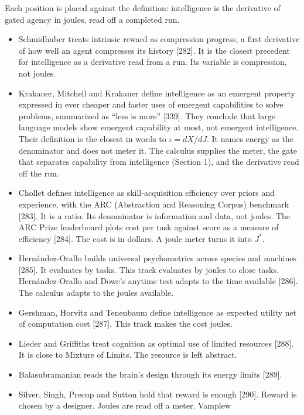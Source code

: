 \documentclass[
  10pt,
]{article}
\providecommand{\tightlist}{%
  \setlength{\itemsep}{0pt}\setlength{\parskip}{0pt}}
\begin{document}
Each position is placed against the definition: intelligence is the
derivative of gated agency in joules, read off a completed run.

\begin{itemize}
\tightlist
\item
  Schmidhuber treats intrinsic reward as compression progress, a first
  derivative of how well an agent compresses its history {[}282{]}. It
  is the closest precedent for intelligence as a derivative read from a
  run. Its variable is compression, not joules.
\item
  Krakauer, Mitchell and Krakauer define intelligence as an emergent
  property expressed in ever cheaper and faster uses of emergent
  capabilities to solve problems, summarized as ``less is more''
  {[}339{]}. They conclude that large language models show emergent
  capability at most, not emergent intelligence. Their definition is the
  closest in words to \(\iota = dX/dJ\). It names energy as the
  denominator and does not meter it. The calculus supplies the meter,
  the gate that separates capability from intelligence (Section 1), and
  the derivative read off the run.
\item
  Chollet defines intelligence as skill-acquisition efficiency over
  priors and experience, with the ARC (Abstraction and Reasoning Corpus)
  benchmark {[}283{]}. It is a ratio. Its denominator is information and
  data, not joules. The ARC Prize leaderboard plots cost per task
  against score as a measure of efficiency {[}284{]}. The cost is in
  dollars. A joule meter turns it into \(J^*\).
\item
  Hernández-Orallo builds universal psychometrics across species and
  machines {[}285{]}. It evaluates by tasks. This track evaluates by
  joules to close tasks. Hernández-Orallo and Dowe's anytime test adapts
  to the time available {[}286{]}. The calculus adapts to the joules
  available.
\item
  Gershman, Horvitz and Tenenbaum define intelligence as expected
  utility net of computation cost {[}287{]}. This track makes the cost
  joules.
\item
  Lieder and Griffiths treat cognition as optimal use of limited
  resources {[}288{]}. It is close to Mixture of Limits. The resource is
  left abstract.
\item
  Balasubramanian reads the brain's design through its energy limits
  {[}289{]}.
\item
  Silver, Singh, Precup and Sutton hold that reward is enough {[}290{]}.
  Reward is chosen by a designer. Joules are read off a meter. Vamplew

\end{itemize}
\end{document}
